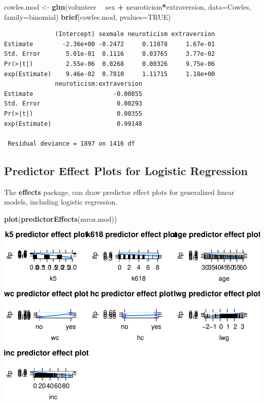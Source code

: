 \documentclass[
]{article}
\newenvironment{Shaded}{\begin{snugshade}}{\end{snugshade}}
\newcommand{\DataTypeTok}[1]{\textcolor[rgb]{0.13,0.29,0.53}{#1}}
\newcommand{\KeywordTok}[1]{\textcolor[rgb]{0.13,0.29,0.53}{\textbf{#1}}}
\newcommand{\NormalTok}[1]{#1}
\newcommand{\OperatorTok}[1]{\textcolor[rgb]{0.81,0.36,0.00}{\textbf{#1}}}
\newcommand{\OtherTok}[1]{\textcolor[rgb]{0.56,0.35,0.01}{#1}}
\newcommand{\StringTok}[1]{\textcolor[rgb]{0.31,0.60,0.02}{#1}}
\begin{document}
\begin{Shaded}
\begin{Highlighting}[]
\NormalTok{cowles.mod <-}\StringTok{ }\KeywordTok{glm}\NormalTok{(volunteer }\OperatorTok{~}\StringTok{ }\NormalTok{sex }\OperatorTok{+}\StringTok{ }\NormalTok{neuroticism}\OperatorTok{*}\NormalTok{extraversion,}
    \DataTypeTok{data=}\NormalTok{Cowles, }\DataTypeTok{family=}\NormalTok{binomial)}
\KeywordTok{brief}\NormalTok{(cowles.mod, }\DataTypeTok{pvalues=}\OtherTok{TRUE}\NormalTok{)}
\end{Highlighting}
\end{Shaded}

\begin{verbatim}
              (Intercept) sexmale neuroticism extraversion
Estimate        -2.36e+00 -0.2472     0.11078     1.67e-01
Std. Error       5.01e-01  0.1116     0.03765     3.77e-02
Pr(>|t|)         2.55e-06  0.0268     0.00326     9.75e-06
exp(Estimate)    9.46e-02  0.7810     1.11715     1.18e+00
              neuroticism:extraversion
Estimate                      -0.00855
Std. Error                     0.00293
Pr(>|t|)                       0.00355
exp(Estimate)                  0.99148

 Residual deviance = 1897 on 1416 df
\end{verbatim}

\hypertarget{predictor-effect-plots-for-logistic-regression}{%
\subsection{Predictor Effect Plots for Logistic
Regression}\label{predictor-effect-plots-for-logistic-regression}}

The \textbf{effects} package, can draw predictor effect plots for
generalized linear models, including logistic regression.

\begin{Shaded}
\begin{Highlighting}[]
\KeywordTok{plot}\NormalTok{(}\KeywordTok{predictorEffects}\NormalTok{(mroz.mod))}
\end{Highlighting}
\end{Shaded}

\includegraphics{LogisticRegressCh6_files/figure-latex/unnamed-chunk-5-1.pdf}
\end{document}

